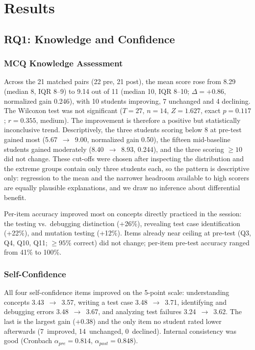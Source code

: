\documentclass[conference]{IEEEtran}
\begin{document}
\section{Results}
\label{sec:results}

\subsection{RQ1: Knowledge and Confidence}

\subsubsection{MCQ Knowledge Assessment}

Across the 21 matched pairs (22 pre, 21 post), the mean score rose from 8.29 (median 8, IQR 8--9) to 9.14 out of 11 (median 10, IQR 8--10; $\Delta = +0.86$, normalized gain 0.246), with 10 students improving, 7 unchanged and 4 declining.
The Wilcoxon test was not significant ($T = 27$, $n = 14$, $Z = 1.627$, exact $p = 0.117$; $r = 0.355$, medium).
The improvement is therefore a positive but statistically inconclusive trend.
Descriptively, the three students scoring below 8 at pre-test gained most (5.67~$\rightarrow$~9.00, normalized gain 0.50), the fifteen mid-baseline students gained moderately (8.40~$\rightarrow$~8.93, 0.244), and the three scoring $\geq 10$ did not change.
These cut-offs were chosen after inspecting the distribution and the extreme groups contain only three students each, so the pattern is descriptive only: regression to the mean and the narrower headroom available to high scorers are equally plausible explanations, and we draw no inference about differential benefit.

Per-item accuracy improved most on concepts directly practiced in the session: the testing vs.\ debugging distinction (+26\%), revealing test case identification (+22\%), and mutation testing (+12\%). Items already near ceiling at pre-test (Q3, Q4, Q10, Q11; $\geq 95\%$ correct) did not change; per-item pre-test accuracy ranged from 41\% to 100\%.

\subsubsection{Self-Confidence}

All four self-confidence items improved on the 5-point scale: understanding concepts 3.43~$\rightarrow$~3.57, writing a test case 3.48~$\rightarrow$~3.71, identifying and debugging errors 3.48~$\rightarrow$~3.67, and analyzing test failures 3.24~$\rightarrow$~3.62. The last is the largest gain ($+0.38$) and the only item no student rated lower afterwards (7~improved, 14~unchanged, 0~declined).
Internal consistency was good (Cronbach $\alpha_{pre} = 0.814$, $\alpha_{post} = 0.848$).
\end{document}
